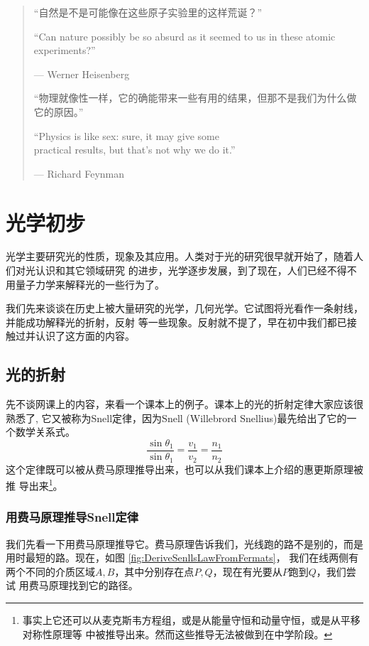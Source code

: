 \begin{quotation}
``自然是不是可能像在这些原子实验里的这样荒诞？''

{\ttfamily
\begin{sloppypar}
``Can nature possibly be so absurd as it seemed to us in these atomic 
experiments?''
\end{sloppypar}

--- Werner Heisenberg}

``物理就像性一样，它的确能带来一些有用的结果，但那不是我们为什么做它的原因。''

{\ttfamily
``Physics is like sex: sure, it may give some \\
practical results, but that's not why 
we do it.''

--- Richard Feynman}

\end{quotation}

\section{光学初步}
光学主要研究光的性质，现象及其应用。人类对于光的研究很早就开始了，随着人们对光认识和其它领域研究
的进步，光学逐步发展，到了现在，人们已经不得不用量子力学来解释光的一些行为了。

我们先来谈谈在历史上被大量研究的光学，几何光学。它试图将光看作一条射线，并能成功解释光的折射，反射
等一些现象。反射就不提了，早在初中我们都已接触过并认识了这方面的内容。

\subsection{光的折射}
先不谈网课上的内容，来看一个课本上的例子。课本上的光的折射定律大家应该很熟悉了,
它又被称为Snell定律，因为Snell (Willebrord Snellius)最先给出了它的一个数学关系式。
\[
\frac{\sin{\theta_1}}{\sin{\theta_1}} = \frac{v_1}{v_2} = \frac{n_1}{n_2}
\]
这个定律既可以被从费马原理\cite{FMsPrinciple}推导出来，也可以从我们课本上介绍的惠更斯原理被推
导出来\footnote{事实上它还可以从麦克斯韦方程组，或是从能量守恒和动量守恒，或是从平移对称性原理等
中被推导出来。然而这些推导无法被做到在中学阶段。}。

\subsubsection{用费马原理推导Snell定律}
我们先看一下用费马原理推导它。费马原理告诉我们，光线跑的路不是别的，而是用时最短的路。现在，如图
\ref{fig:DeriveSenllsLawFromFermats}，
我们在线两侧有两个不同的介质区域$A, B$，其中分别存在点$P, Q$，现在有光要从$P$跑到$Q$，我们尝试
用费马原理找到它的路径。


